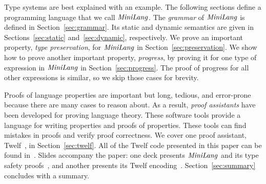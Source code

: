 Type systems are best explained with an example.
The following sections define a programming language
that we call $\mathit{MiniLang}$.
The \emph{grammar} of $\mathit{MiniLang}$ is defined in
Section~\ref{sec:grammar}.
Its static and dynamic semantics are
given in Sections~\ref{sec:static}
and~\ref{sec:dynamic}, respectively.
We prove an important property, \emph{type preservation},
for $\mathit{MiniLang}$ in Section~\ref{sec:preservation}.
We show how to prove another important property,
\emph{progress}, by proving it
for one type of expression in $\mathit{MiniLang}$
in Section~\ref{sec:progress}.
The proof of progress for all other expressions
is similar, so we skip those cases for brevity.

Proofs of language properties are important
but long, tedious, and error-prone
because there are many cases to reason about.
As a result, \emph{proof assistants}
have been developed for proving language theory.
These software tools provide a language
for writing properties and proofs of properties.
These tools can find mistakes in proofs
and verify proof correctness.
We cover one proof assistant, Twelf~\cite{Twelf},
in Section~\ref{sec:twelf}.
All of the Twelf code presented in this paper can
be found in~\cite{twelf-tutorial}.
Slides accompany the paper: one deck presents
$\mathit{MiniLang}$ and its type safety proofs~\cite{typetheory-slides},
and another presents its Twelf encoding~\cite{twelf-slides}.
Section~\ref{sec:summary} concludes with a summary.
